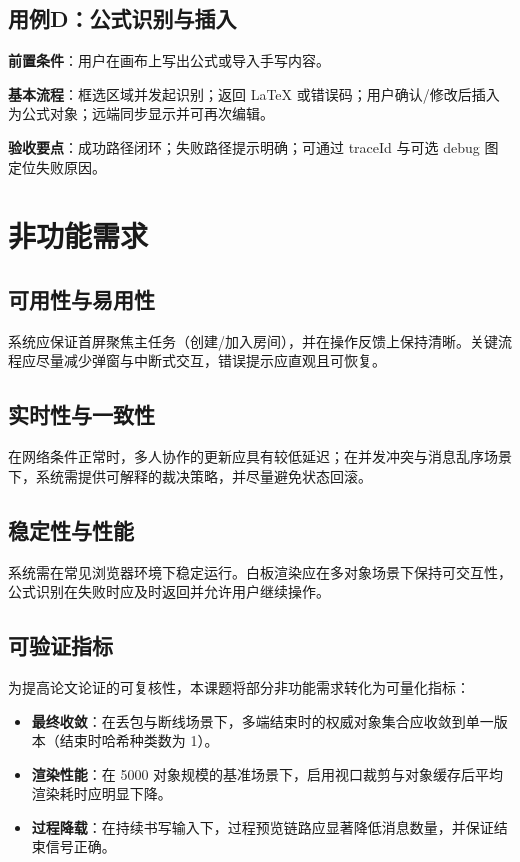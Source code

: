 \subsection{用例D：公式识别与插入}
\textbf{前置条件}：用户在画布上写出公式或导入手写内容。\par
\textbf{基本流程}：框选区域并发起识别；返回 LaTeX 或错误码；用户确认/修改后插入为公式对象；远端同步显示并可再次编辑。\par
\textbf{验收要点}：成功路径闭环；失败路径提示明确；可通过 traceId 与可选 debug 图定位失败原因。

\section{非功能需求}
\subsection{可用性与易用性}
系统应保证首屏聚焦主任务（创建/加入房间），并在操作反馈上保持清晰。关键流程应尽量减少弹窗与中断式交互，错误提示应直观且可恢复。

\subsection{实时性与一致性}
在网络条件正常时，多人协作的更新应具有较低延迟；在并发冲突与消息乱序场景下，系统需提供可解释的裁决策略，并尽量避免状态回滚。

\subsection{稳定性与性能}
系统需在常见浏览器环境下稳定运行。白板渲染应在多对象场景下保持可交互性，公式识别在失败时应及时返回并允许用户继续操作。

\subsection{可验证指标}
为提高论文论证的可复核性，本课题将部分非功能需求转化为可量化指标：
\begin{itemize}
  \item \textbf{最终收敛}：在丢包与断线场景下，多端结束时的权威对象集合应收敛到单一版本（结束时哈希种类数为 1）。
  \item \textbf{渲染性能}：在 5000 对象规模的基准场景下，启用视口裁剪与对象缓存后平均渲染耗时应明显下降。
  \item \textbf{过程降载}：在持续书写输入下，过程预览链路应显著降低消息数量，并保证结束信号正确。
\end{itemize}

